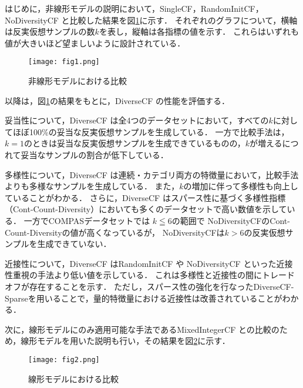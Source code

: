 \documentclass[dvipdfmx]{jreport}
\begin{document}
はじめに，非線形モデルの説明において，SingleCF，RandomInitCF，NoDiversityCF と比較した結果を図\ref{fig:1}に示す．
それぞれのグラフについて，横軸は反実仮想サンプルの数$k$を表し，縦軸は各指標の値を示す．
これらはいずれも値が大きいほど望ましいように設計されている．

\begin{figure}[h]
    \begin{center}
        \texttt{[image: fig1.png]} 
        \caption{非線形モデルにおける比較} \label{fig:1}
    \end{center}
\end{figure}

\newpage

以降は，図\ref{fig:1}の結果をもとに，DiverseCF の性能を評価する．

妥当性について，DiverseCF は全4つのデータセットにおいて，すべての$k$に対してほぼ100\%の妥当な反実仮想サンプルを生成している．
一方で比較手法は，$k=1$のときは妥当な反実仮想サンプルを生成できているものの，$k$が増えるにつれて妥当なサンプルの割合が低下している．

多様性について，DiverseCF は連続・カテゴリ両方の特徴量において，比較手法よりも多様なサンプルを生成している．
また，$k$の増加に伴って多様性も向上していることがわかる．
さらに，DiverseCF はスパース性に基づく多様性指標（Cont-Count-Diversity）においても多くのデータセットで高い数値を示している．
一方でCOMPASデータセットでは $k≦6$の範囲で NoDiversityCFのCont-Count-Diversityの値が高くなっているが， NoDiversityCFは$k>6$の反実仮想サンプルを生成できていない．

近接性について，DiverseCF はRandomInitCF や NoDiversityCF といった近接性重視の手法より低い値を示している．
これは多様性と近接性の間にトレードオフが存在することを示す．
ただし，スパース性の強化を行なったDiverseCF-Sparseを用いることで，量的特徴量における近接性は改善されていることがわかる．

\newpage

次に，線形モデルにのみ適用可能な手法であるMixedIntegerCF との比較のため，線形モデルを用いた説明も行い，その結果を図\ref{fig:2}に示す．
\begin{figure}[h]
    \begin{center}
        \texttt{[image: fig2.png]} 
        \caption{線形モデルにおける比較} \label{fig:2}
    \end{center}
\end{figure}
\end{document}

